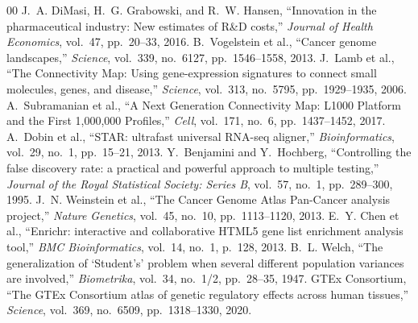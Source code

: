 \documentclass[10pt,journal,compsoc,twocolumn]{IEEEtran}
\begin{document}
\begin{thebibliography}{00}
 J.~A. DiMasi, H.~G. Grabowski, and R.~W. Hansen, ``Innovation in the pharmaceutical industry: New estimates of R\&D costs,'' \emph{Journal of Health Economics}, vol.~47, pp.~20--33, 2016.
 B.~Vogelstein et al., ``Cancer genome landscapes,'' \emph{Science}, vol.~339, no.~6127, pp.~1546--1558, 2013.
 J.~Lamb et al., ``The Connectivity Map: Using gene-expression signatures to connect small molecules, genes, and disease,'' \emph{Science}, vol.~313, no.~5795, pp.~1929--1935, 2006.
 A.~Subramanian et al., ``A Next Generation Connectivity Map: L1000 Platform and the First 1,000,000 Profiles,'' \emph{Cell}, vol.~171, no.~6, pp.~1437--1452, 2017.
 A.~Dobin et al., ``STAR: ultrafast universal RNA-seq aligner,'' \emph{Bioinformatics}, vol.~29, no.~1, pp.~15--21, 2013.
 Y.~Benjamini and Y.~Hochberg, ``Controlling the false discovery rate: a practical and powerful approach to multiple testing,'' \emph{Journal of the Royal Statistical Society: Series B}, vol.~57, no.~1, pp.~289--300, 1995.
 J.~N. Weinstein et al., ``The Cancer Genome Atlas Pan-Cancer analysis project,'' \emph{Nature Genetics}, vol.~45, no.~10, pp.~1113--1120, 2013.
 E.~Y. Chen et al., ``Enrichr: interactive and collaborative HTML5 gene list enrichment analysis tool,'' \emph{BMC Bioinformatics}, vol.~14, no.~1, p.~128, 2013.
 B.~L. Welch, ``The generalization of `Student's' problem when several different population variances are involved,'' \emph{Biometrika}, vol.~34, no.~1/2, pp.~28--35, 1947.
 GTEx Consortium, ``The GTEx Consortium atlas of genetic regulatory effects across human tissues,'' \emph{Science}, vol.~369, no.~6509, pp.~1318--1330, 2020.
\end{thebibliography}
\end{document}
